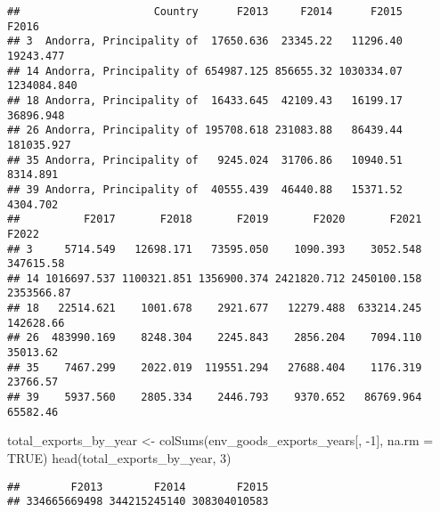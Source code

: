 \documentclass[
]{article}
\newenvironment{Shaded}{\begin{snugshade}}{\end{snugshade}}
\newcommand{\AttributeTok}[1]{\textcolor[rgb]{0.77,0.63,0.00}{#1}}
\newcommand{\ConstantTok}[1]{\textcolor[rgb]{0.00,0.00,0.00}{#1}}
\newcommand{\DecValTok}[1]{\textcolor[rgb]{0.00,0.00,0.81}{#1}}
\newcommand{\FunctionTok}[1]{\textcolor[rgb]{0.00,0.00,0.00}{#1}}
\newcommand{\NormalTok}[1]{#1}
\newcommand{\OtherTok}[1]{\textcolor[rgb]{0.56,0.35,0.01}{#1}}
\newcommand{\SpecialCharTok}[1]{\textcolor[rgb]{0.00,0.00,0.00}{#1}}
\newcommand{\StringTok}[1]{\textcolor[rgb]{0.31,0.60,0.02}{#1}}
\begin{document}
\begin{verbatim}
##                     Country      F2013     F2014      F2015       F2016
## 3  Andorra, Principality of  17650.636  23345.22   11296.40   19243.477
## 14 Andorra, Principality of 654987.125 856655.32 1030334.07 1234084.840
## 18 Andorra, Principality of  16433.645  42109.43   16199.17   36896.948
## 26 Andorra, Principality of 195708.618 231083.88   86439.44  181035.927
## 35 Andorra, Principality of   9245.024  31706.86   10940.51    8314.891
## 39 Andorra, Principality of  40555.439  46440.88   15371.52    4304.702
##          F2017       F2018       F2019       F2020       F2021      F2022
## 3     5714.549   12698.171   73595.050    1090.393    3052.548  347615.58
## 14 1016697.537 1100321.851 1356900.374 2421820.712 2450100.158 2353566.87
## 18   22514.621    1001.678    2921.677   12279.488  633214.245  142628.66
## 26  483990.169    8248.304    2245.843    2856.204    7094.110   35013.62
## 35    7467.299    2022.019  119551.294   27688.404    1176.319   23766.57
## 39    5937.560    2805.334    2446.793    9370.652   86769.964   65582.46
\end{verbatim}

\begin{Shaded}
\begin{Highlighting}[]
\NormalTok{total\_exports\_by\_year }\OtherTok{\textless{}{-}} \FunctionTok{colSums}\NormalTok{(env\_goods\_exports\_years[, }\SpecialCharTok{{-}}\DecValTok{1}\NormalTok{], }\AttributeTok{na.rm =} \ConstantTok{TRUE}\NormalTok{)}
\FunctionTok{head}\NormalTok{(total\_exports\_by\_year, }\DecValTok{3}\NormalTok{)}
\end{Highlighting}
\end{Shaded}

\begin{verbatim}
##        F2013        F2014        F2015 
## 334665669498 344215245140 308304010583
\end{verbatim}

\begin{Shaded}
\end{Shaded}
\end{document}
